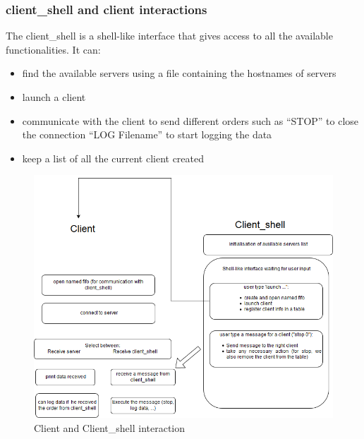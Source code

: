 \subsubsection{client\_shell and client interactions}

The client\_shell is a shell-like interface that gives access to all the available functionalities.
It can:
\begin{itemize}
	\item find the available servers using a file containing the hostnames of servers
	\item launch a client
	\item communicate with the client to send different orders such as
		\subitem "`STOP"' to close the connection
		\subitem "`LOG Filename"' to start logging the data
  \item keep a list of all the current client created
	\end{itemize}




\begin{figure}[H]
\begin{center}
\includegraphics[width=\textwidth]{image/clientshellClient.png}%
\caption{Client and Client\_shell interaction}%
\label{figure:CSC}%
\end{center}
\end{figure}

